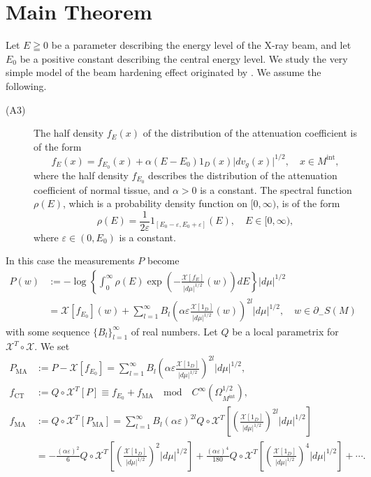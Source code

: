 \documentclass[a4paper,11pt,reqno]{amsart}
\numberwithin{equation}{section}
\theoremstyle{definition}
\theoremstyle{remark}
\begin{document}
\section{Main Theorem}
\label{section:MAIN}
%
%
Let $E\geqq0$ be a parameter describing the energy level of the X-ray beam, and let $E_0$ be a positive constant describing the central energy level. We study the very simple model of the beam hardening effect originated by \cite{ParkChoiSeo}. We assume the following. 
%
%
\begin{description}
\item[(A3)] 
The half density $f_E(x)$ of the distribution of the attenuation coefficient is of the form
%
%
$$
f_E(x)
=
f_{E_0}(x)
+
\alpha(E-E_0)1_D(x)\lvert{dv_g(x)}\rvert^{1/2}, 
\quad
x \in M^\text{int},
$$
%
%
where the half density $f_{E_0}$ describes the distribution of the attenuation coefficient of normal tissue, 
and $\alpha>0$ is a constant. The spectral function $\rho(E)$, which is a probability density function on $[0,\infty)$, is of the form 
%
%
$$
\rho(E)
=
\frac{1}{2\varepsilon}
1_{[E_0-\varepsilon,E_0+\varepsilon]}(E),
\quad
E\in[0,\infty),
$$
%
%
where $\varepsilon \in(0,E_0)$ is a constant. 
\end{description}
%
%
In this case the measurements $P$ become 
%
%
\begin{align*}
  P(w)
& :=
  -
  \log\left\{
       \int_0^\infty
       \rho(E)
       \exp\left(
           -
           \frac{\mathcal{X}[f_E]}{\lvert{d\mu}\rvert^{1/2}}(w)
           \right)
       dE
       \right\}
  \lvert{d\mu}\rvert^{1/2}
\\
& =
  \mathcal{X}[f_{E_0}](w)
  +
  \sum_{l=1}^\infty
  B_l
  \left(\alpha\varepsilon\frac{\mathcal{X}[1_D]}{\lvert{d\mu}\rvert^{1/2}}(w)\right)^{2l}
  \lvert{d\mu}\rvert^{1/2},
  \quad
  w \in \partial_-S(M) 
\end{align*}
%
%
with some sequence $\{B_l\}_{l=1}^\infty$ of real numbers. 
Let $Q$ be a local parametrix for $\mathcal{X}^T\circ\mathcal{X}$. 
We set 
%
%
\begin{align*}
  P_\text{MA}
& :=
  P-\mathcal{X}[f_{E_0}]
  =
  \sum_{l=1}^\infty
  B_l
  \left(\alpha\varepsilon\frac{\mathcal{X}[1_D]}{\lvert{d\mu}\rvert^{1/2}}\right)^{2l}
  \lvert{d\mu}\rvert^{1/2},
\\
  f_\text{CT}
& :=
  Q\circ\mathcal{X}^T[P]
  \equiv
  f_{E_0}+f_\text{MA}
  \quad
  \text{mod}
  \quad
  C^\infty(\Omega_{M^\text{int}}^{1/2}), 
\\
  f_\text{MA}
& :=
  Q\circ\mathcal{X}^T[P_\text{MA}]
  =
  \sum_{l=1}^\infty
  B_l(\alpha\varepsilon)^{2l}
  Q\circ\mathcal{X}^T
  \left[
  \left(\frac{\mathcal{X}[1_D]}{\lvert{d\mu}\rvert^{1/2}}\right)^{2l}
  \lvert{d\mu}\rvert^{1/2}
  \right]
\\
& =
  -
  \frac{(\alpha\varepsilon)^2}{6}
  Q\circ\mathcal{X}^T
  \left[
  \left(\frac{\mathcal{X}[1_D]}{\lvert{d\mu}\rvert^{1/2}}\right)^2
  \lvert{d\mu}\rvert^{1/2}
  \right]
  +
  \frac{(\alpha\varepsilon)^4}{180}
  Q\circ\mathcal{X}^T
  \left[
  \left(\frac{\mathcal{X}[1_D]}{\lvert{d\mu}\rvert^{1/2}}\right)^4
  \lvert{d\mu}\rvert^{1/2}
  \right]
  +
  \dotsb.
\end{align*}
\end{document}
